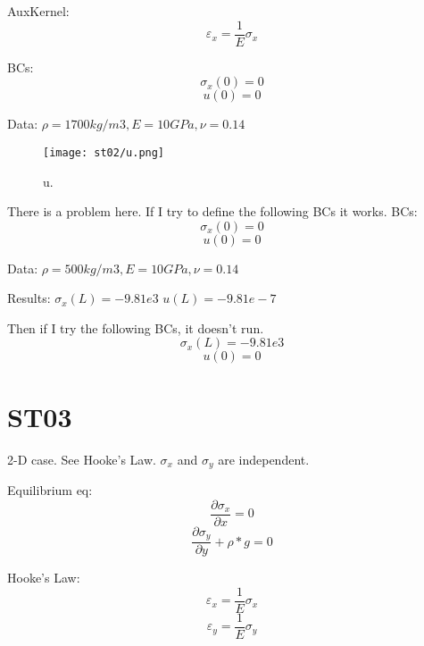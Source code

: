 \documentclass[11pt,letterpaper]{article}
\begin{document}
AuxKernel:
\begin{equation}
\varepsilon_x = \frac{1}{E}\sigma_x
\end{equation}

BCs:
\begin{equation}
\sigma_x (0) = 0
\end{equation}
\begin{equation}
u (0) = 0
\end{equation}

Data: $\rho = 1700 kg/m3, E = 10 GPa, \nu = 0.14$

\begin{figure}[H]
	\centering
	\texttt{[image: st02/u.png]}
	\hfill
	\caption{u.}
	\label{fig:st02}
\end{figure}

There is a problem here. If I try to define the following BCs it works.
BCs:
\begin{equation}
\sigma_x (0) = 0
\end{equation}
\begin{equation}
u (0) = 0
\end{equation}

Data: $\rho = 500 kg/m3, E = 10 GPa, \nu = 0.14$

Results:
$ \sigma_x (L) = -9.81e3$
$ u(L) = -9.81e-7$

Then if I try the following BCs, it doesn't run.
\begin{equation}
\sigma_x (L) = -9.81e3
\end{equation}
\begin{equation}
u (0) = 0
\end{equation}

\section{ST03}

2-D case. See Hooke's Law. $\sigma_x$ and $\sigma_y$ are independent.

Equilibrium eq:
\begin{equation}
\frac{\partial \sigma_x}{\partial x} = 0
\end{equation}
\begin{equation}
\frac{\partial \sigma_y}{\partial y} + \rho * g = 0
\end{equation}

Hooke's Law:
\begin{equation}
\varepsilon_x = \frac{1}{E} \sigma_x
\end{equation}
\begin{equation}
\varepsilon_y = \frac{1}{E} \sigma_y
\end{equation}
\end{document}
